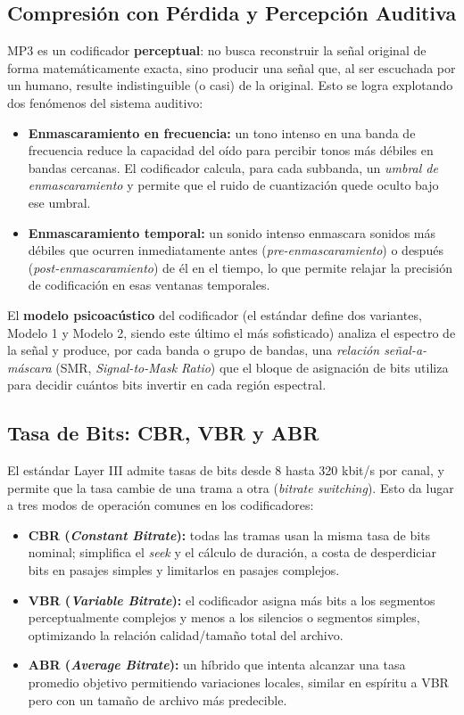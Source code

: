 \documentclass[pdflatex,sn-mathphys-num]{sn-jnl}%
\begin{document}
\subsection{Compresión con Pérdida y Percepción Auditiva}
MP3 es un codificador \textbf{perceptual}: no busca reconstruir la señal original de forma matemáticamente exacta, sino producir una señal que, al ser escuchada por un humano, resulte indistinguible (o casi) de la original. Esto se logra explotando dos fenómenos del sistema auditivo:

\begin{itemize}
    \item \textbf{Enmascaramiento en frecuencia:} un tono intenso en una banda de frecuencia reduce la capacidad del oído para percibir tonos más débiles en bandas cercanas. El codificador calcula, para cada subbanda, un \textit{umbral de enmascaramiento} y permite que el ruido de cuantización quede oculto bajo ese umbral.
    \item \textbf{Enmascaramiento temporal:} un sonido intenso enmascara sonidos más débiles que ocurren inmediatamente antes (\textit{pre-enmascaramiento}) o después (\textit{post-enmascaramiento}) de él en el tiempo, lo que permite relajar la precisión de codificación en esas ventanas temporales.
\end{itemize}

El \textbf{modelo psicoacústico} del codificador (el estándar define dos variantes, Modelo 1 y Modelo 2, siendo este último el más sofisticado) analiza el espectro de la señal y produce, por cada banda o grupo de bandas, una \textit{relación señal-a-máscara} (SMR, \textit{Signal-to-Mask Ratio}) que el bloque de asignación de bits utiliza para decidir cuántos bits invertir en cada región espectral.

\subsection{Tasa de Bits: CBR, VBR y ABR}
El estándar Layer III admite tasas de bits desde 8 hasta 320 kbit/s por canal, y permite que la tasa cambie de una trama a otra (\textit{bitrate switching}). Esto da lugar a tres modos de operación comunes en los codificadores:
\begin{itemize}
    \item \textbf{CBR (\textit{Constant Bitrate}):} todas las tramas usan la misma tasa de bits nominal; simplifica el \textit{seek} y el cálculo de duración, a costa de desperdiciar bits en pasajes simples y limitarlos en pasajes complejos.
    \item \textbf{VBR (\textit{Variable Bitrate}):} el codificador asigna más bits a los segmentos perceptualmente complejos y menos a los silencios o segmentos simples, optimizando la relación calidad/tamaño total del archivo.
    \item \textbf{ABR (\textit{Average Bitrate}):} un híbrido que intenta alcanzar una tasa promedio objetivo permitiendo variaciones locales, similar en espíritu a VBR pero con un tamaño de archivo más predecible.
\end{itemize}
\end{document}
